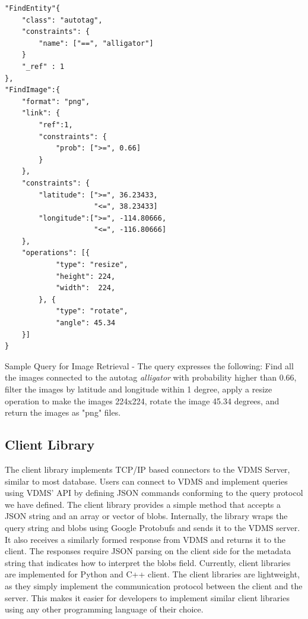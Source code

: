 \begin{listing}[ht!]
\begin{verbatim}
"FindEntity"{
    "class": "autotag",
    "constraints": {
        "name": ["==", "alligator"]
    }
    "_ref" : 1
},
"FindImage":{
    "format": "png",
    "link": {
        "ref":1,
        "constraints": {
            "prob": [">=", 0.66]
        }
    },
    "constraints": {
        "latitude": [">=", 36.23433,
                     "<=", 38.23433]
        "longitude":[">=", -114.80666,
                     "<=", -116.80666]
    },
    "operations": [{
            "type": "resize",
            "height": 224,
            "width":  224,
        }, {
            "type": "rotate",
            "angle": 45.34
    }]
}

\end{verbatim}
\caption{Sample Query for Image Retrieval -
The query expresses the following:
Find all the images connected to the autotag \textit{alligator}
with probability higher than 0.66,
filter the images by latitude and longitude within 1 degree,
apply a resize operation to make the images 224x224,
rotate the image 45.34 degrees,
and return the images as "png" files.}
\label{findimagegeo}
\end{listing}

\subsection{Client Library}

The client library implements TCP/IP based connectors to the VDMS Server,
similar to most database\cite{memsql, mysql, postgresql}.
Users can connect to VDMS and implement queries using VDMS' API
by defining JSON commands conforming to the query protocol we have defined.
The client library provides a simple method that
accepts a JSON string and an array or vector of blobs.
Internally, the library wraps the query string and blobs using
Google Protobufs \cite{protobufs} and sends it to the VDMS server.
It also receives a similarly formed response from VDMS
and returns it to the client.
The responses require JSON parsing on the client
side for the metadata string that indicates how to interpret the blobs field.
Currently, client libraries are implemented for Python and C++ client.
The client libraries are lightweight, as they simply implement the communication
protocol between the client and the server.
This makes it easier for developers to implement similar client libraries using
any other programming language of their choice.
